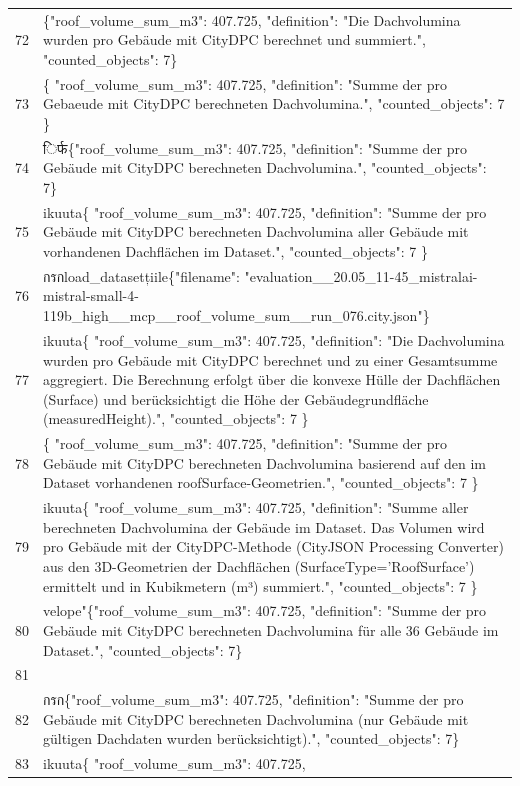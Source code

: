 \documentclass[a4paper,11pt]{article}
\begin{document}
\begin{table}[ht]
\begin{tabular}{r p{12cm}}
72 & \{"roof\_volume\_sum\_m3": 407.725, "definition": "Die Dachvolumina wurden pro Gebäude mit CityDPC berechnet und summiert.", "counted\_objects": 7\} \\
73 & \{
  "roof\_volume\_sum\_m3": 407.725,
  "definition": "Summe der pro Gebaeude mit CityDPC berechneten Dachvolumina.",
  "counted\_objects": 7
\} \\
74 & िर्फ\{"roof\_volume\_sum\_m3": 407.725, "definition": "Summe der pro Gebäude mit CityDPC berechneten Dachvolumina.", "counted\_objects": 7\} \\
75 & ikuuta\{
  "roof\_volume\_sum\_m3": 407.725,
  "definition": "Summe der pro Gebäude mit CityDPC berechneten Dachvolumina aller Gebäude mit vorhandenen Dachflächen im Dataset.",
  "counted\_objects": 7
\} \\
76 &  กรกload\_datasetțiile\{"filename": "evaluation\_\_20.05\_11-45\_mistralai-mistral-small-4-119b\_high\_\_mcp\_\_roof\_volume\_sum\_\_run\_076.city.json"\} \\
77 & ikuuta\{
  "roof\_volume\_sum\_m3": 407.725,
  "definition": "Die Dachvolumina wurden pro Gebäude mit CityDPC berechnet und zu einer Gesamtsumme aggregiert. Die Berechnung erfolgt über die konvexe Hülle der Dachflächen (Surface) und berücksichtigt die Höhe der Gebäudegrundfläche (measuredHeight).",
  "counted\_objects": 7
\} \\
78 & \{
  "roof\_volume\_sum\_m3": 407.725,
  "definition": "Summe der pro Gebäude mit CityDPC berechneten Dachvolumina basierend auf den im Dataset vorhandenen roofSurface-Geometrien.",
  "counted\_objects": 7
\} \\
79 & ikuuta\{
  "roof\_volume\_sum\_m3": 407.725,
  "definition": "Summe aller berechneten Dachvolumina der Gebäude im Dataset. Das Volumen wird pro Gebäude mit der CityDPC-Methode (CityJSON Processing Converter) aus den 3D-Geometrien der Dachflächen (SurfaceType='RoofSurface') ermittelt und in Kubikmetern (m³) summiert.",
  "counted\_objects": 7
\} \\
80 & velope"\{"roof\_volume\_sum\_m3": 407.725, "definition": "Summe der pro Gebäude mit CityDPC berechneten Dachvolumina für alle 36 Gebäude im Dataset.", "counted\_objects": 7\} \\
81 &  \\
82 &  กรก\{"roof\_volume\_sum\_m3": 407.725, "definition": "Summe der pro Gebäude mit CityDPC berechneten Dachvolumina (nur Gebäude mit gültigen Dachdaten wurden berücksichtigt).", "counted\_objects": 7\} \\
83 & ikuuta\{
  "roof\_volume\_sum\_m3": 407.725,

\end{tabular}
\end{table}
\end{document}
